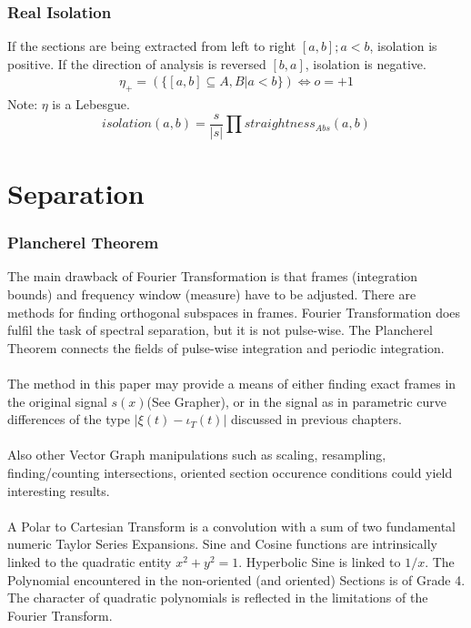 \documentclass{report}
\begin{document}
\subsection{Real Isolation}
If the sections are being extracted from left to right $[a,b];a<b$, isolation is positive. If the direction of analysis is reversed $[b,a]$, isolation is negative.
\begin{align}
\eta_{+}=(\{[a,b] \subseteq A,B \vert a<b\}) \Leftrightarrow o=+1
\end{align}
Note: $\eta$ is a Lebesgue.
\begin{equation}
isolation(a,b)=\frac{s}{\lvert s \rvert} \prod straightness_{Abs}(a,b)
\end{equation}

\chapter{Separation}

\subsection{Plancherel Theorem}
The main drawback of Fourier Transformation is that frames (integration bounds) and frequency window (measure) have to be adjusted. There are methods for finding orthogonal subspaces in frames. Fourier Transformation does fulfil the task of spectral separation, but it is not pulse-wise. The Plancherel Theorem connects the fields of pulse-wise integration and periodic integration.\\\\
The method in this paper may provide a means of either finding exact frames in the original signal $s(x)$(See Grapher), or in the signal as in parametric curve differences of the type $\lvert \xi(t)-\iota_{T}(t) \rvert$ discussed in previous chapters.\\\\
Also other Vector Graph manipulations such as scaling, resampling, finding/counting intersections, oriented section occurence conditions could yield interesting results.\\\\
A Polar to Cartesian Transform is a convolution with a sum of two fundamental numeric Taylor Series Expansions. Sine and Cosine functions are intrinsically linked to the quadratic entity $x^2 + y^2 =1$. Hyperbolic Sine is linked to $1/x$. The Polynomial encountered in the non-oriented (and oriented) Sections is of Grade 4. The character of quadratic polynomials is reflected in the limitations of the Fourier Transform.
\end{document}
